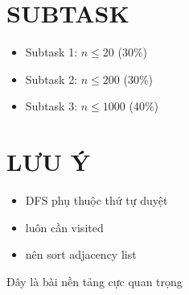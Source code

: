 \documentclass[a4paper,12pt]{article}
\begin{document}
\section*{SUBTASK}
\begin{itemize}
\item Subtask 1: $n \le 20$ (30\%)
\item Subtask 2: $n \le 200$ (30\%)
\item Subtask 3: $n \le 1000$ (40\%)
\end{itemize}

\section*{LƯU Ý}
\begin{itemize}
\item DFS phụ thuộc thứ tự duyệt
\item luôn cần visited
\item nên sort adjacency list
\end{itemize}

\begin{tcolorbox}
Đây là bài nền tảng cực quan trọng
\end{tcolorbox}
\end{document}
